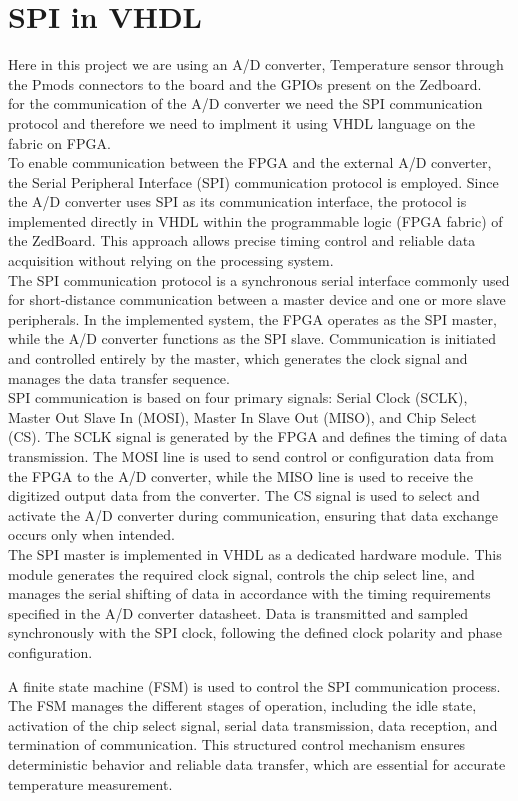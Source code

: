 \section{SPI in VHDL}
Here in this project we are using an A/D converter, Temperature sensor through the Pmods connectors to the board and the GPIOs present on the Zedboard. \\
for the communication of the A/D converter we need the SPI communication protocol and therefore we need to implment it using VHDL language on the fabric on FPGA. \\
To enable communication between the FPGA and the external A/D converter, the Serial Peripheral Interface (SPI) communication protocol is employed. Since the A/D converter uses SPI as its communication interface, the protocol is implemented directly in VHDL within the programmable logic (FPGA fabric) of the ZedBoard. This approach allows precise timing control and reliable data acquisition without relying on the processing system.\\
The SPI communication protocol is a synchronous serial interface commonly used for short-distance communication between a master device and one or more slave peripherals. In the implemented system, the FPGA operates as the SPI master, while the A/D converter functions as the SPI slave. Communication is initiated and controlled entirely by the master, which generates the clock signal and manages the data transfer sequence.\\
SPI communication is based on four primary signals: Serial Clock (SCLK), Master Out Slave In (MOSI), Master In Slave Out (MISO), and Chip Select (CS). The SCLK signal is generated by the FPGA and defines the timing of data transmission. The MOSI line is used to send control or configuration data from the FPGA to the A/D converter, while the MISO line is used to receive the digitized output data from the converter. The CS signal is used to select and activate the A/D converter during communication, ensuring that data exchange occurs only when intended.\\
The SPI master is implemented in VHDL as a dedicated hardware module. This module generates the required clock signal, controls the chip select line, and manages the serial shifting of data in accordance with the timing requirements specified in the A/D converter datasheet. Data is transmitted and sampled synchronously with the SPI clock, following the defined clock polarity and phase configuration.

A finite state machine (FSM) is used to control the SPI communication process. The FSM manages the different stages of operation, including the idle state, activation of the chip select signal, serial data transmission, data reception, and termination of communication. This structured control mechanism ensures deterministic behavior and reliable data transfer, which are essential for accurate temperature measurement.

